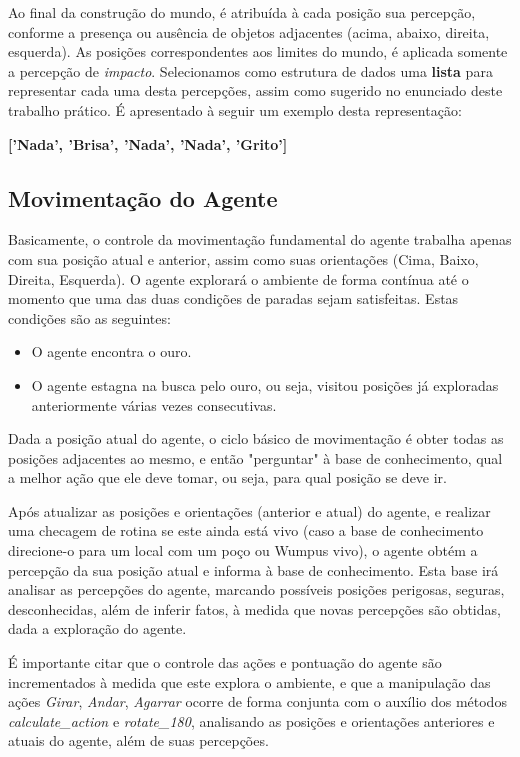 \documentclass[a4paper, 12pt]{article}
\begin{document}
Ao final da construção do mundo, é atribuída à cada posição sua percepção, conforme a presença ou ausência de objetos adjacentes (acima, abaixo, direita, esquerda). As posições correspondentes aos limites do mundo, é aplicada somente a percepção de \emph{impacto}. Selecionamos como estrutura de dados uma \textbf{lista} para representar cada uma desta percepções, assim como sugerido no enunciado deste trabalho prático. É apresentado à seguir um exemplo desta representação:

\begin{center}
    \normalsize\textbf{['Nada', 'Brisa', 'Nada', 'Nada', 'Grito']}
\end{center}

\subsection{Movimentação do Agente}

Basicamente, o controle da movimentação fundamental do agente trabalha apenas com sua posição atual e anterior, assim como suas orientações (Cima, Baixo, Direita, Esquerda). O agente explorará o ambiente de forma contínua até o momento que uma das duas condições de paradas sejam satisfeitas. Estas condições são as seguintes:

\begin{itemize}
    \item O agente encontra o ouro.
    \item O agente estagna na busca pelo ouro, ou seja, visitou posições já exploradas anteriormente várias vezes consecutivas.
\end{itemize}

Dada a posição atual do agente, o ciclo básico de movimentação é obter todas as posições adjacentes ao mesmo, e então "perguntar" à base de conhecimento, qual a melhor ação que ele deve tomar, ou seja, para qual posição se deve ir.

Após atualizar as posições e orientações (anterior e atual) do agente, e realizar uma checagem de rotina se este ainda está vivo (caso a base de conhecimento direcione-o para um local com um poço ou Wumpus vivo), o agente obtém a percepção da sua posição atual e informa à base de conhecimento. Esta base irá analisar as percepções do agente, marcando possíveis posições perigosas, seguras, desconhecidas, além de inferir fatos, à medida que novas percepções são obtidas, dada a exploração do agente.

É importante citar que o controle das ações e pontuação do agente são incrementados à medida que este explora o ambiente, e que a manipulação das ações \emph{Girar}, \emph{Andar}, \emph{Agarrar} ocorre de forma conjunta com o auxílio dos métodos \emph{calculate\_action} e \emph{rotate\_180}, analisando as posições e orientações anteriores e atuais do agente, além de suas percepções.
\end{document}
